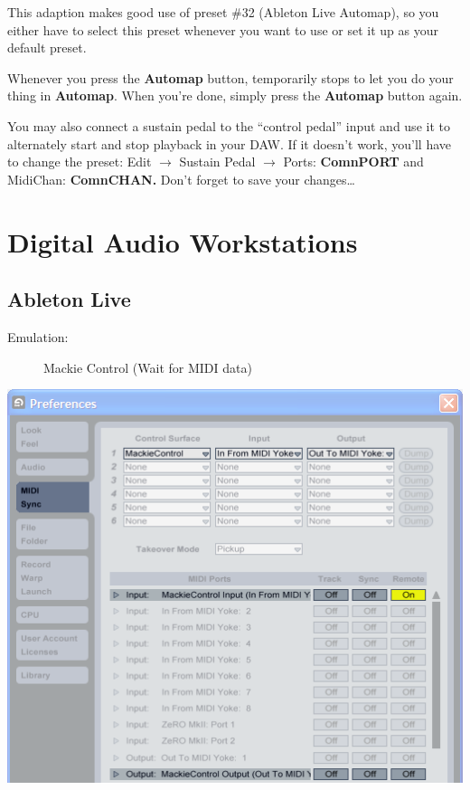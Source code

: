 This adaption makes good use of preset \#32 (Ableton Live Automap), so
you either have to select this preset whenever you want to use
 or set it up as your default preset.

Whenever you press the \textbf{Automap} button,  temporarily stops to let you do your thing in \textbf{Automap}.
When you're done, simply press the \textbf{Automap} button again.

You may also connect a sustain pedal to the ``control pedal'' input
and use it to alternately start and stop playback in your DAW.  If it
doesn't work, you'll have to change the preset: Edit $\rightarrow{}$
Sustain Pedal $\rightarrow{}$ Ports: \textbf{ComnPORT} and MidiChan:
\textbf{ComnCHAN.}  Don't forget to save your changes\dots

\chapter{Digital Audio Workstations}
\label{chap:daw_setup}

\section{Ableton Live}

\begin{description}
\item[Emulation:] Mackie Control (Wait for MIDI data)
\end{description}

\includegraphics[scale=\screenshotscale,clip]{include/images/live_8.png}

